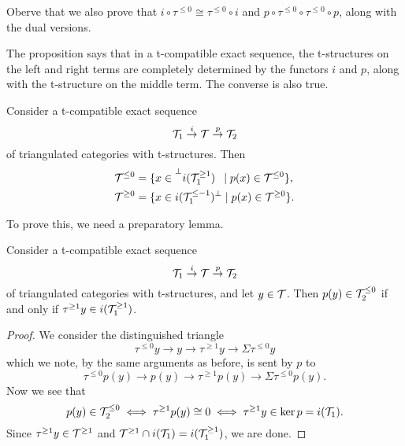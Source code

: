 \begin{remark}
	Oberve that we also prove that \(i\circ\tau^{\leq 0} \cong \tau^{\leq 0}\circ i\) and \(p\circ \tau^{\leq 0} \circ \tau^{\leq 0}\circ p\), along with the dual versions.
\end{remark}

The proposition says that in a t-compatible exact sequence, the t-structures on the left and right terms are completely determined by the functors \(i\) and \(p\), along
with the t-structure on the middle term. The converse is also true.
\begin{proposition}\label{prop:t-compatible-exact-sequence-middle-formula-from-sides}
	Consider a t-compatible exact sequence
	\[ \mathcal{T}_1 \overset{i}\to \mathcal{T} \overset{p}\to \mathcal{T}_2 \]
	of triangulated categories with t-structures. Then
	\begin{align*}
		\mathcal{T}^{\leq 0} &= \{ x\in\prescript{\perp}{}{i(\ensuremath{\mathcal{T}}_1^{\geq 1})}\phantom{.}\hspace{0.8mm} \mid p(x)\in\mathcal{T}^{\leq 0} \},\\
		\mathcal{T}^{\geq 0} &= \{ x\in i(\mathcal{T}_1^{\leq -1})^\perp \mid p(x)\in\mathcal{T}^{\geq 0} \}.
	\end{align*}
\end{proposition}

To prove this, we need a preparatory lemma.
\begin{lemma}\label{lemma:t-compatible-exact-sequence-right-aisle-criterion}
	Consider a t-compatible exact sequence
	\[ \mathcal{T}_1 \overset{i}\to \mathcal{T} \overset{p}\to \mathcal{T}_2 \]
	of triangulated categories with t-structures, and let \(y\in\mathcal{T}\). Then \(p(y)\in\mathcal{T}_2^{\leq 0}\) if and only if \(\tau^{\geq 1}y \in i(\mathcal{T}_1^{\geq 1})\).
\end{lemma}
\begin{proof}
We consider the distinguished triangle
\[ \tau^{\leq 0}y \to y \to \tau^{\geq 1}y \to \Sigma\tau^{\leq 0}y \]
which we note, by the same arguments as before, is sent by \(p\) to
\[ \tau^{\leq 0}p(y) \to p(y) \to \tau^{\geq 1}p(y) \to \Sigma\tau^{\leq 0}p(y). \]
Now we see that
\[ p(y)\in\mathcal{T}_2^{\leq 0} \iff \tau^{\geq 1}p(y) \cong 0 \iff \tau^{\geq 1}y \in \ker{p} = i(\mathcal{T}_1). \]
Since \(\tau^{\geq 1}y \in \mathcal{T}^{\geq 1}\) and \(\mathcal{T}^{\geq 1}\cap i(\mathcal{T}_1) = i(\mathcal{T}_1^{\geq 1})\), we are done.
\end{proof}

